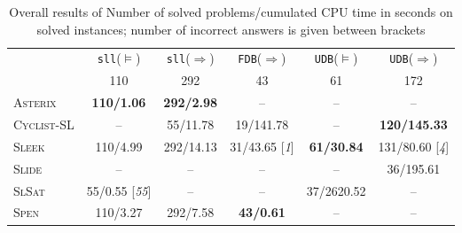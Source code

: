 \documentclass[twoside,11pt]{article}
\newcommand{\limp}{\Rightarrow}
\newcommand{\sllsat}{\texttt{sll}($\models$)}
\newcommand{\sllent}{\texttt{sll}($\limp$)}
\newcommand{\FDBent}{\texttt{FDB}($\limp$)}
\newcommand{\UDBsat}{\texttt{UDB}($\models$)}
\newcommand{\UDBent}{\texttt{UDB}($\limp$)}
\newcommand{\ASTERIX}{\textsc{Asterix}}
\newcommand{\CYCLIST}{\textsc{Cyclist-SL}}
\newcommand{\SLEEK}{\textsc{Sleek}}
\newcommand{\SLIDE}{\textsc{Slide}}
\newcommand{\SLSAT}{\textsc{SlSat}}
\newcommand{\SPEN}{\textsc{Spen}}
\begin{document}
\begin{table}
\begin{center}
\begin{tabular}{lccccc}\hline
& \sllsat & \sllent & \FDBent
& \UDBsat & \UDBent \\
& 110 & 292 & 43 & 61 & 172 \\
\hline
\ASTERIX &
\textbf{110/1.06} &  %
\textbf{292/2.98} &  %
-- &
-- &
--
\\\hline
\CYCLIST &
-- &
55/11.78 & %
19/141.78 & %
-- &
\textbf{120/145.33} %
\\\hline
\SLEEK &
110/4.99 & %
292/14.13 & %
31/43.65 [\emph{1}] & %
\textbf{61/30.84} & %
131/80.60 [\emph{4}] %
\\\hline
\SLIDE &
-- &
-- &
-- &
-- &
36/195.61 %
\\\hline
\SLSAT &
55/0.55 [\emph{55}] & %
--  &
--  &
37/2620.52 & %
--
\\\hline
\SPEN &
110/3.27 & %
292/7.58 & %
\textbf{43/0.61} & %
-- &
--
\\\hline
\end{tabular}
\end{center}
\caption{Overall results of Number of solved problems/cumulated CPU time in seconds on solved instances;
number of incorrect answers is given between brackets %
}
\label{tab:overall}
\end{table}


%
%
\end{document}
